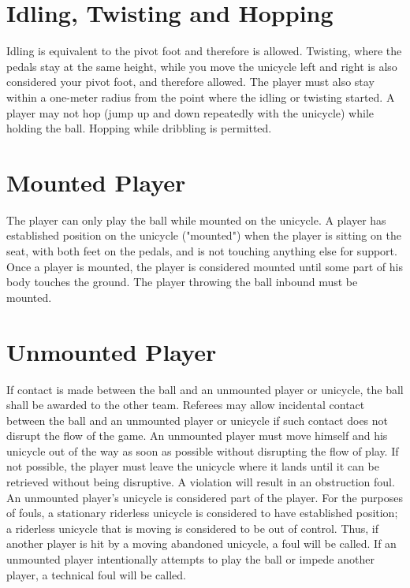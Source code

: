 \section{Idling, Twisting and Hopping}
Idling is equivalent to the pivot foot and therefore is allowed. Twisting, where the pedals stay at the same height, while
you move the unicycle left and right is also considered your pivot foot, and therefore allowed. The player must also stay
within a one-meter radius from the point where the idling or twisting started. A player may not hop (jump up and down
repeatedly with the unicycle) while holding the ball. Hopping while dribbling is permitted.

\section{Mounted Player}
The player can only play the ball while mounted on the unicycle. A player has established position on the unicycle
("mounted") when the player is sitting on the seat, with both feet on the pedals, and is not touching anything else for
support. Once a player is mounted, the player is considered mounted until some part of his body touches the ground. The
player throwing the ball inbound must be mounted.

\section{Unmounted Player}
If contact is made between the ball and an unmounted player or unicycle, the ball shall be awarded to the other team.
Referees may allow incidental contact between the ball and an unmounted player or unicycle if such contact does not
disrupt the flow of the game. An unmounted player must move himself and his unicycle out of the way as soon as possible
without disrupting the flow of play. If not possible, the player must leave the unicycle where it lands until it can be
retrieved without being disruptive. A violation will result in an obstruction foul.\\
An unmounted player's unicycle is considered part of the player. For the purposes of fouls, a stationary riderless unicycle
is considered to have established position; a riderless unicycle that is moving is considered to be out of control. Thus, if
another player is hit by a moving abandoned unicycle, a foul will be called. If an unmounted player intentionally attempts
to play the ball or impede another player, a technical foul will be called.

